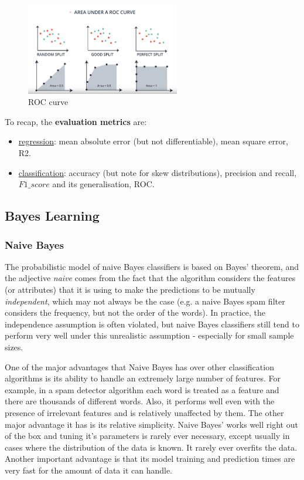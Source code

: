 \documentclass[11pt]{article}
\begin{document}
\begin{figure}[htbp] 
	\centering
	\includegraphics[width=0.6\textwidth]{pics/ROC_curve}
	\caption{ROC curve}  
	\label{ROC_curve}
\end{figure}


To recap, the \textbf{evaluation metrics} are:
\begin{itemize}
	\item \underline{regression}: mean absolute error (but not differentiable), mean square error, R2.
	\item \underline{classification}: accuracy (but note for skew distributions), precision and recall, $F1\_score$ and its generalisation, ROC.
\end{itemize}


\subsection{Bayes Learning} \label{Bayes} 

\subsubsection{Naive Bayes}
The probabilistic model of naive Bayes classifiers is based on Bayes' theorem, and the adjective \textit{naive} comes from the fact that the algorithm considers the features (or attributes) that it is using to make the predictions to be mutually \textit{independent}, which may not always be the case (e.g. a naive Bayes spam filter considers the frequency, but not the order of the words). In practice, the independence assumption is often violated, but naive Bayes classifiers still tend to perform very well under this unrealistic assumption - especially for small sample sizes.

One of the major advantages that Naive Bayes has over other classification algorithms is its ability to handle an extremely large number of features. For example, in a spam detector algorithm each word is treated as a feature and there are thousands of different words. Also, it performs well even with the presence of irrelevant features and is relatively unaffected by them. The other major advantage it has is its relative simplicity. Naive Bayes' works well right out of the box and tuning it's parameters is rarely ever necessary, except usually in cases where the distribution of the data is known. It rarely ever overfits the data. Another important advantage is that its model training and prediction times are very fast for the amount of data it can handle. 
\end{document}
